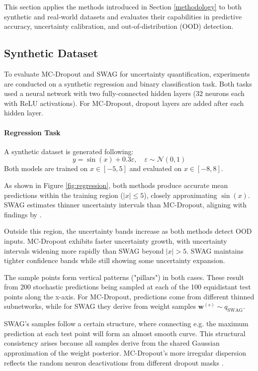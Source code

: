 
This section applies the methods introduced in Section \ref{methodology} to both synthetic and
real‑world datasets and evaluates their capabilities in predictive accuracy, uncertainty calibration, and out-of-distribution (OOD) detection.

\subsection{Synthetic Dataset}
\label{exp:synthetic}
To evaluate MC-Dropout and SWAG for uncertainty quantification, experiments are conducted on a synthetic 
regression and binary classification task. Both tasks used a neural network with two fully-connected
hidden layers (32 neurons each with ReLU activations). For MC‑Dropout, dropout layers are added
after each hidden layer.

\paragraph{Regression Task}
A synthetic dataset is generated following:
\[
y = \sin(x) + 0.3\varepsilon, \quad \varepsilon \sim \mathcal{N}(0,1)
\]
Both models are trained on $x \in [-5, 5]$ and evaluated on $x \in [-8, 8]$.

\vspace{0.15cm}
As shown in Figure \ref{fig:regression}, both methods produce accurate mean predictions within the training region ($|x| \leq 5$), closely approximating $\sin(x)$. SWAG estimates thinner
uncertainty intervals than MC-Dropout, aligning with findings by \citet{maddox2019swag}.

Outside this region, the uncertainty bands increase as both methods detect OOD inputs. MC-Dropout
exhibits faster uncertainty growth, with uncertainty intervals widening more rapidly than SWAG beyond
$|x| > 5$. SWAG maintains tighter confidence bands while still showing some uncertainty expansion.

The sample points form vertical patterns ("pillars") in both cases. These result from 200 stochastic
predictions being sampled at each of the 100 equidistant test points along the x-axis. For MC-Dropout,
predictions come from different thinned subnetworks, while for SWAG they derive from weight samples
$\mathbf{w}^{(s)} \sim q_{\mathrm{SWAG}}$.

SWAG's samples follow a certain structure, where connecting e.g. the maximum prediction at each test
point will form an almost smooth curve. This structural consistency arises because all samples derive from the
shared Gaussian approximation of the weight posterior. MC-Dropout's more irregular dispersion reflects the random
neuron deactivations from different dropout masks \citep{gal2016mcdropout}.

